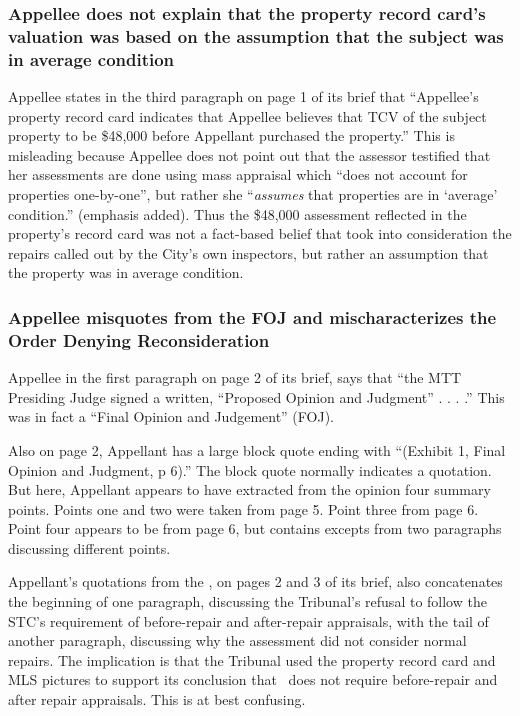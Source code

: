 \documentclass[12pt,\documentclassflag]{michiganCourtOfAppealsBrief}
\begin{document}
\subsubsection{Appellee does not explain that the property record card's valuation was based on the assumption that the subject was in average condition}

Appellee states in the third paragraph on page 1 of its brief that ``Appellee's property record card indicates that Appellee believes that TCV of the subject property to be \$48,000 before Appellant purchased the property.'' This is misleading because Appellee does not point out that the assessor testified that her assessments are done using mass appraisal which ``does not account for properties one-by-one'', but rather she ``{\em assumes} that properties are in `average' condition.'' \foj[4] (emphasis added). Thus the \$48,000 assessment reflected in the property's record card was not a fact-based belief that took into consideration the repairs called out by the City's own inspectors, but rather an assumption that the property was in average condition.

\subsubsection{Appellee misquotes from the FOJ and mischaracterizes the Order Denying Reconsideration}

Appellee in the first paragraph on page 2 of its brief, says that ``the MTT Presiding Judge signed a written, ``Proposed Opinion and Judgment'' . . . .'' This was in fact a ``Final Opinion and Judgement'' (FOJ).

Also on page 2, Appellant has a large block quote ending with ``(Exhibit 1, Final Opinion and Judgment, p 6).'' The block quote normally indicates a quotation. But here, Appellant appears to have extracted from the opinion four summary points. Points one and two were taken from page 5. Point three from page 6. Point four appears to be from page 6, but contains excepts from two paragraphs discussing different points.

Appellant's quotations from the \reconsiderationDenied[2], on pages 2 and 3 of its brief, also concatenates the beginning of one paragraph, discussing the Tribunal's refusal to follow the STC's requirement of before-repair and after-repair appraisals, with the tail of another paragraph, discussing why the assessment did not consider normal repairs. The implication is that the Tribunal used the property record card and MLS pictures to support its conclusion that \mathieuGast\ does not require before-repair and after repair appraisals. This is at best confusing.
\end{document}
